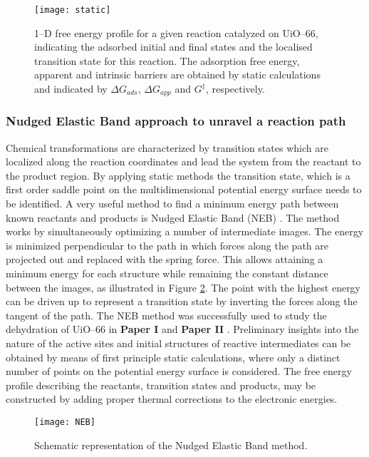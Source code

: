 \begin{figure}[!h]
	\centering
	\texttt{[image: static]}
	\caption{1--D free energy profile for a given reaction catalyzed on UiO--66, indicating the adsorbed initial and final states and the localised
	transition state for this reaction. The adsorption free energy, apparent and intrinsic barriers are obtained by static calculations and
	indicated by $\Delta G_{ads}$, $\Delta G_{app}$ and $G^\ddag$, respectively.}
	\label{fig:static}
\end{figure}
\npar
\newpage
\subsubsection*{Nudged Elastic Band approach to unravel a reaction path}
Chemical transformations are characterized by transition states which are
localized along the reaction coordinates and lead the system from the reactant
to the product region. By applying static methods the transition state, which is
a first order saddle point on the multidimensional potential energy surface
needs to be identified. A very useful method to find a minimum energy
path between known reactants and products is Nudged Elastic
Band (NEB) \cite{Sheppard2012, Sheppard2011, Sheppard2008}. The method works by
simultaneously optimizing a number of intermediate images. The energy is minimized perpendicular to the path in which
forces along the path are projected out and replaced with the spring force.
This allows attaining a minimum energy for each structure while remaining the
constant distance between the images, as
illustrated in Figure \ref{fig:NEB}. The point with the highest energy can be driven
up to represent a transition state by inverting the forces along the tangent of the
path. The NEB method was successfully used to study the dehydration of
UiO--66 in \textbf{Paper I} and \textbf{Paper II} \cite{Vandichel2015,
Vandichel2016}. Preliminary insights into the nature of the active sites and
initial structures of reactive intermediates can be obtained by means of first principle static calculations, where only a
distinct number of points on the potential energy surface is considered. The free energy profile
describing the reactants, transition states and products, may be constructed by adding proper thermal
corrections to the electronic energies.

\begin{figure}[!h]
	\centering
	\texttt{[image: NEB]}
	\caption{Schematic representation of the Nudged Elastic Band method.}
	\label{fig:NEB}
\end{figure}


